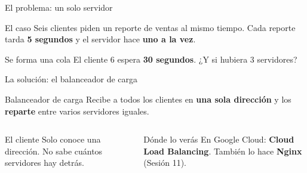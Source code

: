 \documentclass[aspectratio=169,10pt,c]{beamer}
\begin{document}
\begin{frame}{El problema: un solo servidor}
\begin{block}{El caso}
\small Seis clientes piden un reporte de ventas al mismo tiempo. Cada reporte tarda \textbf{5 segundos} y el servidor hace \textbf{uno a la vez}.
\end{block}
\vspace{6mm}
\begin{center}
\end{center}
\vspace{6mm}
\begin{alertblock}{Se forma una cola}
\small El cliente 6 espera \textbf{30 segundos}. ¿Y si hubiera 3 servidores?
\end{alertblock}
\end{frame}

\begin{frame}{La solución: el balanceador de carga}
\begin{center}
\end{center}
\vspace{2mm}
\begin{block}{Balanceador de carga}
\small Recibe a todos los clientes en \textbf{una sola dirección} y los \textbf{reparte} entre varios servidores iguales.
\end{block}
\begin{columns}[T,onlytextwidth]
\begin{exampleblock}{El cliente}
\small Solo conoce una dirección. No sabe cuántos servidores hay detrás.
\end{exampleblock}
\begin{exampleblock}{Dónde lo verás}
\small En Google Cloud: \textbf{Cloud Load Balancing}. También lo hace \textbf{Nginx} (Sesión 11).
\end{exampleblock}
\end{columns}
\end{frame}
\end{document}
